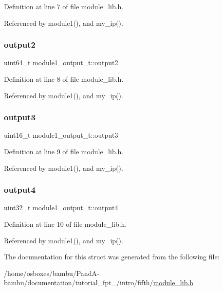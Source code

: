 Definition at line 7 of file module\+\_\+lib.\+h.



Referenced by module1(), and my\+\_\+ip().

\mbox{\label{structmodule1__output__t_a4e931afd78a7f9d8cf38c9684c185d6e}} 
\subsubsection{\texorpdfstring{output2}{output2}}
{\footnotesize\ttfamily uint64\+\_\+t module1\+\_\+output\+\_\+t\+::output2}



Definition at line 8 of file module\+\_\+lib.\+h.



Referenced by module1(), and my\+\_\+ip().

\mbox{\label{structmodule1__output__t_ade7d350de705d80df997b2f54bbf8991}} 
\subsubsection{\texorpdfstring{output3}{output3}}
{\footnotesize\ttfamily uint16\+\_\+t module1\+\_\+output\+\_\+t\+::output3}



Definition at line 9 of file module\+\_\+lib.\+h.



Referenced by module1(), and my\+\_\+ip().

\mbox{\label{structmodule1__output__t_a872f87bd41744bcf8471ac43108b39bf}} 
\subsubsection{\texorpdfstring{output4}{output4}}
{\footnotesize\ttfamily uint32\+\_\+t module1\+\_\+output\+\_\+t\+::output4}



Definition at line 10 of file module\+\_\+lib.\+h.



Referenced by module1(), and my\+\_\+ip().



The documentation for this struct was generated from the following file\+:\begin{DoxyCompactItemize}
\item 
/home/osboxes/bambu/\+Pand\+A-\/bambu/documentation/tutorial\+\_\+fpt\+\_/intro/fifth/\hyperlink{tutorial__fpt__2017_2intro_2fifth_2module__lib_8h}{module\+\_\+lib.\+h}\end{DoxyCompactItemize}
